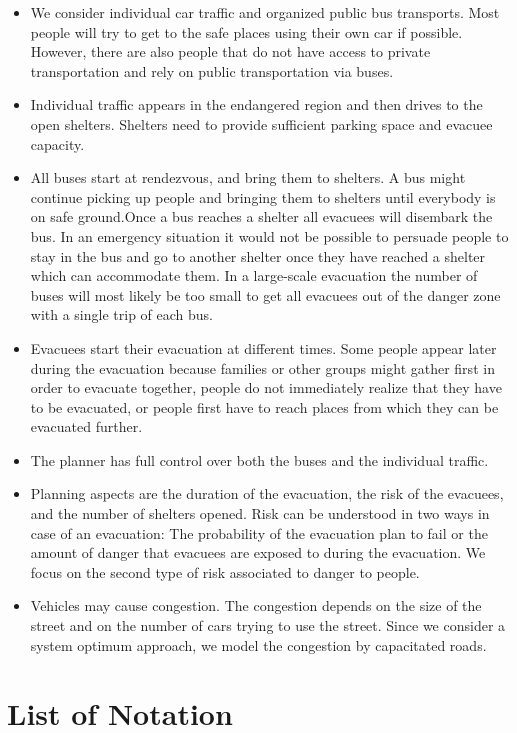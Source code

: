 \documentclass{mcmthesis}
\begin{document}
\begin{itemize}
\item We consider individual car traffic and organized public bus transports.
  Most people will try to get to the safe places using their own car if possible. However, there are also people that do not have access to private transportation and rely on public transportation via buses.
\item Individual traffic appears in the endangered region and then drives to the open shelters. Shelters need to provide sufficient parking space and evacuee capacity.
\item All buses start at rendezvous, and bring them to shelters.
 A bus might continue picking up people and bringing them to shelters until everybody is on safe ground.Once a bus reaches a shelter all evacuees will disembark the bus. In an emergency situation it would not be possible to persuade people to stay in the bus and go to another shelter once they have reached a shelter which can accommodate them. In a large-scale evacuation the number of buses will most likely be too small to get all evacuees out of the danger zone with a single trip of each bus.
\item Evacuees start their evacuation at different times.
Some people appear later during the evacuation because families or other groups might gather first in order to evacuate together, people do not immediately realize that they have to be evacuated, or people first have to reach places from which they can be evacuated further.
\item The planner has full control over both the buses and the individual traffic.
\item Planning aspects are the duration of the evacuation, the risk of the evacuees, and the number of shelters opened.
Risk can be understood in two ways in case of an evacuation: The probability of the evacuation plan to fail or the amount of danger that evacuees are exposed to during the evacuation. We focus on the second type of risk associated to danger to people.

\item Vehicles may cause congestion.
The congestion depends on the size of the street and on the number of cars trying to use the street. Since we consider a system optimum approach, we model the congestion by capacitated roads.
\end{itemize}

\section{List of Notation}
\end{document}

